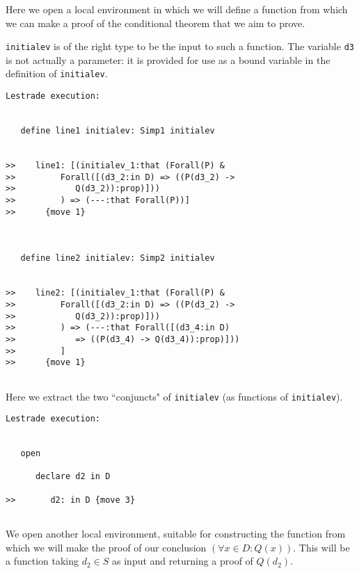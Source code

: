 \documentclass{slides}
\begin{document}
Here we open a local environment in which we will define a function from which we can make a proof of the conditional
theorem that we aim to prove.

{\tt initialev} is of the right type to be the input to such a function.  The variable {\tt d3} is not actually a parameter:
it is provided for use as a bound variable in the definition of {\tt initialev}.

\begin{slide}

{\tiny

\begin{verbatim}Lestrade execution:


   define line1 initialev: Simp1 initialev


>>    line1: [(initialev_1:that (Forall(P) &
>>         Forall([(d3_2:in D) => ((P(d3_2) ->
>>            Q(d3_2)):prop)]))
>>         ) => (---:that Forall(P))]
>>      {move 1}



   define line2 initialev: Simp2 initialev


>>    line2: [(initialev_1:that (Forall(P) &
>>         Forall([(d3_2:in D) => ((P(d3_2) ->
>>            Q(d3_2)):prop)]))
>>         ) => (---:that Forall([(d3_4:in D)
>>            => ((P(d3_4) -> Q(d3_4)):prop)]))
>>         ]
>>      {move 1}


\end{verbatim}
}

\end{slide}

Here we extract the two ``conjuncts" of {\tt initialev} (as functions of {\tt initialev}).

\begin{slide}

\begin{verbatim}Lestrade execution:


   open

      declare d2 in D

>>       d2: in D {move 3}


\end{verbatim}

\end{slide}

We open another local environment, suitable for constructing the function from which we will make the proof of our conclusion $(\forall x \in D:Q(x))$.
This will be a function taking $d_2 \in S$ as input and returning a proof of $Q(d_2)$.
\end{document}
